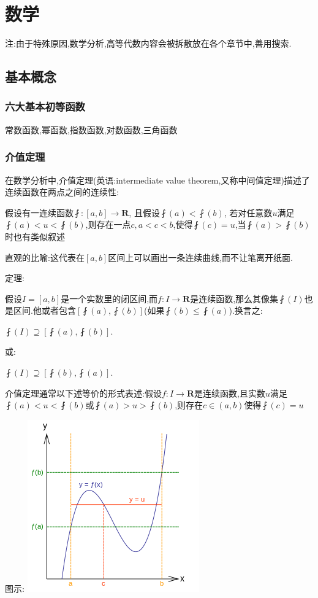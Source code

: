 \documentclass[UTF8,12pt]{ctexbook}
\begin{document}
\chapter{数学}{

注:由于特殊原因,数学分析,高等代数内容会被拆散放在各个章节中,善用搜索.

\section{基本概念}{

\subsection{六大基本初等函数}{
  常数函数,幂函数,指数函数,对数函数,三角函数
}%

\subsection{介值定理}{

在数学分析中,介值定理(英语:intermediate value theorem,又称中间值定理)描述了连续函数在两点之间的连续性:

假设有一连续函数$\fint:[a,b]\rightarrow \mathbf{R}$, 且假设$\fint(a)<\fint(b)$, 若对任意数$u$满足$\fint(a)<u<\fint(b)$,则存在一点$c,a<c<b$,使得$\fint(c) = u$,当$\fint(a)>\fint(b)$时也有类似叙述

直观的比喻:这代表在$[a,b]$区间上可以画出一条连续曲线,而不让笔离开纸面.
\newline

定理:

假设$I = [a,b]$是一个实数里的闭区间,而$f:I\rightarrow\mathbf{R}$是连续函数,那么其像集$\fint(I)$也是区间.他或者包含$[\fint(a),\fint(b)]$(如果$\fint(b)\leq\fint(a)$).换言之:

$\fint(I)\supseteq[\fint(a),\fint(b)]$.

或:

$\fint(I)\supseteq[\fint(b), \fint(a)]$.

介值定理通常以下述等价的形式表述:假设$f:I\rightarrow\mathbf{R}$是连续函数,且实数$u$满足$\fint(a)<u<\fint(b)$或$\fint(a)>u>\fint(b)$,则存在$c\in(a,b)$使得$\fint(c) = u$

\begin{center}
  图示:
  \includegraphics{resources/Intermediatevaluetheorem.png}
\end{center}
}%

}}
\end{document}
